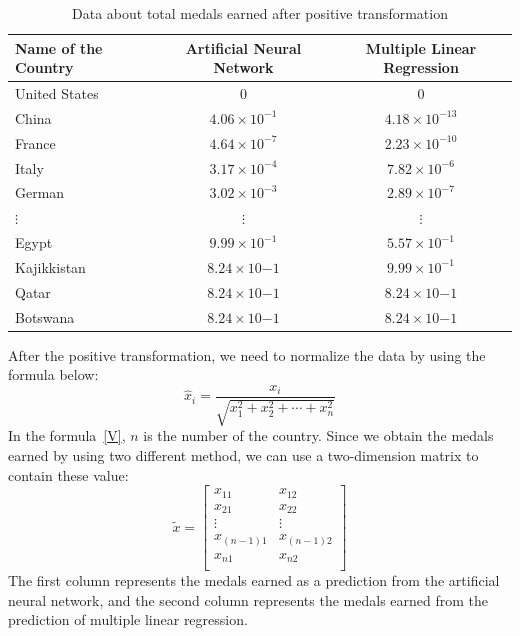 \documentclass{mcmthesis}
\begin{document}
\begin{table}[H]
\centering 
\label{A}
\caption{Data about total medals earned after positive transformation}
\vspace{5pt}
\begin{tabular}{lcc}
\hline
\textbf{Name of the Country} & \textbf{Artificial Neural Network} & \textbf{Multiple Linear Regression} \\
\hline\hline
United States & 0 & 0\\
China & $4.06\times 10^{-1}$  & $4.18\times 10^{-13}$\\
France & $4.64\times 10^{-7}$ & $2.23\times 10^{-10}$\\
Italy & $3.17\times 10^{-4}$ & $7.82\times 10^{-6}$\\
German & $3.02\times 10^{-3}$ & $2.89\times 10^{-7}$\\
$\vdots$ & $\vdots$ & $\vdots$ \\ 
Egypt & $9.99\times 10^{-1}$ & $5.57\times 10^{-1}$\\
Kajikkistan & $8.24\times 10{-1}$ & $9.99\times 10^{-1}$\\
Qatar & $8.24\times 10{-1}$ & $8.24\times 10{-1}$\\
Botswana & $8.24\times 10{-1}$ & $8.24\times 10{-1}$\\
\hline
\end{tabular}
\end{table}
After the positive transformation, we need to normalize the data by using the formula below:\\
\begin{equation}\label{V}
\hat{x}_i=\frac{x_i}{\sqrt{x_{1}^{2}+x_{2}^{2}+\cdots+x_{n}^{2}}}
\end{equation}
In the formula~\eqref{V}, $n$ is the number of the country. Since we obtain the medals earned by using two different method, we can use a two-dimension matrix to contain these value:\\
\begin{equation}\label{eq:3}
\tilde{x}=
\begin{bmatrix}
	x_{11}&		x_{12}\\
	x_{21}&		x_{22}\\
	\vdots&		\vdots\\
	x_{(n-1)1}&		x_{(n-1)2}\\
	x_{n1}&		x_{n2}\\
\end{bmatrix}
\end{equation}
The first column represents the medals earned as a prediction from the artificial neural network, and the second column represents the medals earned from the prediction of multiple linear regression.
\end{document}
